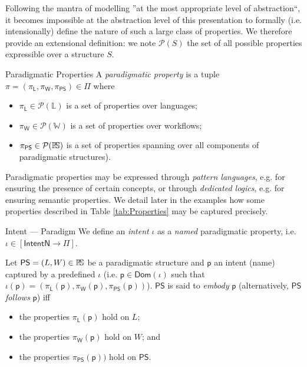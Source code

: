 Following the mantra of modelling ''at the most appropriate 
level of abstraction``, it becomes impossible at the abstraction level of this 
presentation to formally (i.e. intensionally) define the nature of such a large 
class of properties. We therefore provide an extensional definition: we note 
$\mathcal{P}(S)$ the set of all possible properties expressible over a 
structure $S$. 


\begin{Definition}{Paradigmatic Properties}
   A \emph{paradigmatic property} is a tuple 
$\pi = (\pi_{\mathsf{L}},\pi_{\mathsf{W}},\pi_{\mathsf{PS}}) \in \Pi$ where
\begin{itemize}
   \item $\pi_{\mathsf{L}} \in \mathcal{P}(\mathbb{L})$ is a set of properties 
over languages;
   \item $\pi_{\mathsf{W}} \in \mathcal{P}(\mathbb{W})$ is a set of properties 
over workflows;
   \item $\pi_{\mathsf{PS}}\in\mathcal{P}(\mathbb{P}\!\mathbb{S})$ is a set of 
properties spanning over all components of paradigmatic structures).
\end{itemize}
\end{Definition}
\noindent
Paradigmatic properties may be expressed through \emph{pattern languages}, e.g. 
for ensuring the presence of certain concepts, or through \emph{dedicated 
logics}, e.g. for ensuring semantic properties. We detail later in the examples 
how some properties described in Table \ref{tab:Properties} may be captured 
precisely.

\begin{Definition}{Intent --- Paradigm}
   We define an \emph{intent} $\iota$ as a \emph{named} paradigmatic property, 
i.e. $\iota \in [\mathsf{IntentN} \to \Pi]$.

   Let $\mathsf{PS} = (L, W)\in\mathbb{P}\!\mathbb{S}$ be a paradigmatic structure and 
$\mathsf{p}$ an intent (name) captured by a predefined $\iota$ (i.e. 
$\mathsf{p}\in \mathsf{Dom}(\iota)$ such that 
$\iota(\mathsf{p}) = (\pi_{\mathsf{L}}(\mathsf{p}), 
                     \pi_{\mathsf{W}}(\mathsf{p}), 
                     \pi_{\mathsf{PS}}(\mathsf{p}))$). 
$\mathsf{PS}$ is said to \emph{embody} $\mathsf{p}$ (alternatively, 
$\mathsf{PS}$ \emph{follows} $\mathsf{p}$) iff 
\begin{itemize}
   \item the properties $\pi_{\mathsf{L}}(\mathsf{p})$ hold on $L$;
   \item the properties $\pi_{\mathsf{W}}(\mathsf{p})$ hold on $W$; and
   \item the properties $ \pi_{\mathsf{PS}}(\mathsf{p}))$ hold on $\mathsf{PS}$.
\end{itemize}

\end{Definition}

